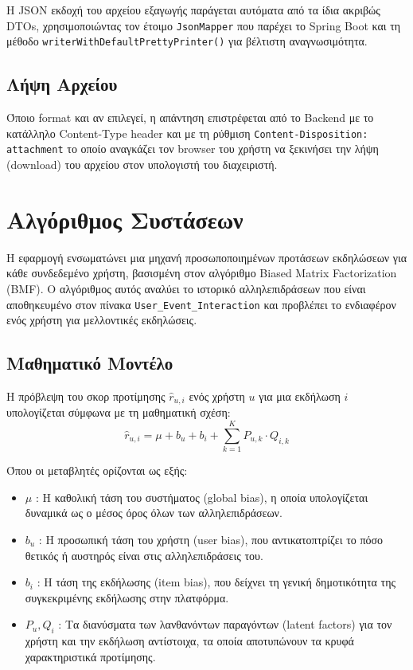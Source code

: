 \documentclass[12pt]{fphw}
\newcommand{\en}[1]{\foreignlanguage{english}{#1}}
\begin{document}
Η \en{JSON} εκδοχή του αρχείου εξαγωγής παράγεται αυτόματα από τα ίδια ακριβώς \en{DTOs}, χρησιμοποιώντας τον έτοιμο \en{\texttt{JsonMapper}} που παρέχει το \en{Spring Boot} και τη μέθοδο \en{\texttt{writerWithDefaultPrettyPrinter()}} για βέλτιστη αναγνωσιμότητα.

\subsection{Λήψη Αρχείου}
Όποιο format και αν επιλεγεί, η απάντηση επιστρέφεται από το \en{Backend} με το κατάλληλο \en{Content-Type header} και με τη ρύθμιση \en{\texttt{Content-Disposition: attachment}} το οποίο αναγκάζει τον \en{browser} του χρήστη να ξεκινήσει την λήψη (\en{download}) του αρχείου στον υπολογιστή του διαχειριστή.

\newpage


\section{Αλγόριθμος Συστάσεων}
Η εφαρμογή ενσωματώνει μια μηχανή προσωποποιημένων προτάσεων εκδηλώσεων για κάθε συνδεδεμένο χρήστη, βασισμένη στον αλγόριθμο \en{Biased Matrix Factorization (BMF)}. Ο αλγόριθμος αυτός αναλύει το ιστορικό αλληλεπιδράσεων που είναι αποθηκευμένο στον πίνακα \en{\texttt{User\_Event\_Interaction}} και προβλέπει το ενδιαφέρον ενός χρήστη για μελλοντικές εκδηλώσεις.

\subsection{Μαθηματικό Μοντέλο}
Η πρόβλεψη του σκορ προτίμησης $\hat{r}_{u,i}$ ενός χρήστη $u$ για μια εκδήλωση $i$ υπολογίζεται σύμφωνα με τη μαθηματική σχέση:
$$\hat{r}_{u,i} = \mu + b_u + b_i + \sum_{k=1}^{K} P_{u,k} \cdot Q_{i,k}$$

Όπου οι μεταβλητές ορίζονται ως εξής:
\begin{itemize}[leftmargin=*]
    \item $\mu$ : Η καθολική τάση του συστήματος (\en{global bias}), η οποία υπολογίζεται δυναμικά ως ο μέσος όρος όλων των αλληλεπιδράσεων.
    \item $b_u$ : Η προσωπική τάση του χρήστη (\en{user bias}), που αντικατοπτρίζει το πόσο θετικός ή αυστηρός είναι στις αλληλεπιδράσεις του.
    \item $b_i$ : Η τάση της εκδήλωσης (\en{item bias}), που δείχνει τη γενική δημοτικότητα της συγκεκριμένης εκδήλωσης στην πλατφόρμα.
    \item $P_u, Q_i$ : Τα διανύσματα των λανθανόντων παραγόντων (\en{latent factors}) για τον χρήστη και την εκδήλωση αντίστοιχα, τα οποία αποτυπώνουν τα κρυφά χαρακτηριστικά προτίμησης.
\end{itemize}
\end{document}
